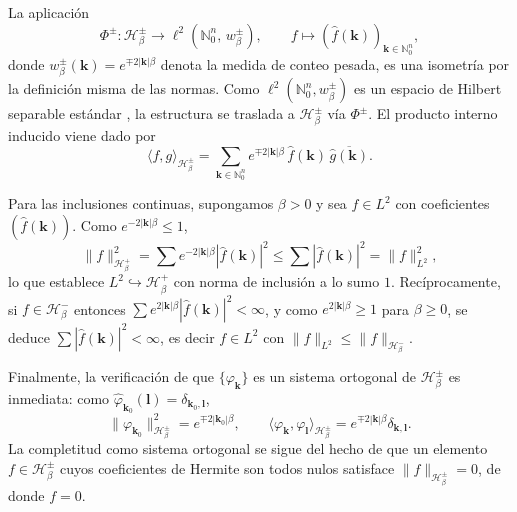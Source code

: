             \begin{Proof}
                La aplicación
                \begin{equation*}
                    \Phi^\pm: \mathcal{H}_\beta^\pm \to \ell^2(\mathbb{N}_0^n,\, w^\pm_\beta), \qquad f \mapsto (\hat{f}(\boldsymbol{k}))_{\boldsymbol{k}\in\mathbb{N}_0^n},
                \end{equation*}
                donde $w^\pm_\beta(\boldsymbol{k}) = e^{\mp 2|\boldsymbol{k}|\beta}$ denota la medida de conteo pesada, es una isometría por la definición misma de las normas. Como $\ell^2(\mathbb{N}_0^n, w^\pm_\beta)$ es un espacio de Hilbert separable estándar \citep[Thm. 4.17]{brezis2011functional}, la estructura se traslada a $\mathcal{H}_\beta^\pm$ vía $\Phi^\pm$. El producto interno inducido viene dado por
                \begin{equation*}
                    \langle f,g\rangle_{\mathcal{H}_\beta^\pm} = \sum_{\boldsymbol{k}\in \mathbb{N}_0^n} e^{\mp 2|\boldsymbol{k}|\beta}\, \hat{f}(\boldsymbol{k})\,\overline{\hat{g}(\boldsymbol{k})}.
                \end{equation*}

                Para las inclusiones continuas, supongamos $\beta>0$ y sea $f\in L^2$ con coeficientes $(\hat{f}(\boldsymbol{k}))$. Como $e^{-2|\boldsymbol{k}|\beta}\leq 1$,
                \begin{equation*}
                    \|f\|_{\mathcal{H}_\beta^+}^2 = \sum e^{-2|\boldsymbol{k}|\beta}|\hat{f}(\boldsymbol{k})|^2 \leq \sum |\hat{f}(\boldsymbol{k})|^2 = \|f\|_{L^2}^2,
                \end{equation*}
                lo que establece $L^2\hookrightarrow \mathcal{H}_\beta^+$ con norma de inclusión a lo sumo $1$. Recíprocamente, si $f\in \mathcal{H}_\beta^-$ entonces $\sum e^{2|\boldsymbol{k}|\beta}|\hat{f}(\boldsymbol{k})|^2 <\infty$, y como $e^{2|\boldsymbol{k}|\beta}\geq 1$ para $\beta\geq 0$, se deduce $\sum|\hat{f}(\boldsymbol{k})|^2<\infty$, es decir $f\in L^2$ con $\|f\|_{L^2}\leq \|f\|_{\mathcal{H}_\beta^-}$.

                Finalmente, la verificación de que $\{\varphi_{\boldsymbol{k}}\}$ es un sistema ortogonal de $\mathcal{H}_\beta^\pm$ es inmediata: como $\hat{\varphi}_{\boldsymbol{k}_0}(\boldsymbol{l}) = \delta_{\boldsymbol{k}_0,\boldsymbol{l}}$,
                \begin{equation*}
                    \|\varphi_{\boldsymbol{k}_0}\|_{\mathcal{H}_\beta^\pm}^2 = e^{\mp 2|\boldsymbol{k}_0|\beta}, \qquad \langle \varphi_{\boldsymbol{k}}, \varphi_{\boldsymbol{l}}\rangle_{\mathcal{H}_\beta^\pm} = e^{\mp 2|\boldsymbol{k}|\beta}\delta_{\boldsymbol{k},\boldsymbol{l}}.
                \end{equation*}
                La completitud como sistema ortogonal se sigue del hecho de que un elemento $f\in\mathcal{H}_\beta^\pm$ cuyos coeficientes de Hermite son todos nulos satisface $\|f\|_{\mathcal{H}_\beta^\pm}=0$, de donde $f=0$.
            \end{Proof}

